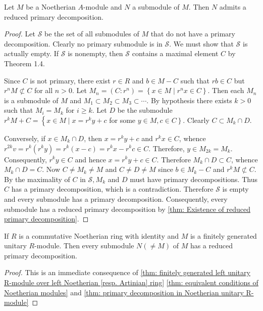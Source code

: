 \begin{theorem}
    \label{thm: primary decomposition in Noetherian unitary R-module}
    Let $M$ be a Noetherian $A$-module and $N$ a submodule of $M$. Then $N$ admits a reduced primary decomposition.
    \begin{proof}
        Let $\mathcal{S}$ be the set of all submodules of $M$ that do not have a primary decomposition.
        Clearly no primary submodule is in $\mathcal{S}$.
        We must show that $\mathcal{S}$ is actually empty. If $\mathcal{S}$ is nonempty, then $\mathcal{S}$ contains a maximal element $C$ by Theorem 1.4.

        Since $C$ is not primary, there exist $r \in R$ and $b \in M-C$ such that $r b \in C$ but $r^n M \not \subset C$ for all $n>0$.
        Let $M_n=\left(C:r^n\right)=\left\{x \in M \mid r^n x \in C\right\}$.
        Then each $M_n$ is a submodule of $M$ and $M_1 \subset M_2 \subset M_3 \subset \cdots$. By hypothesis there exists $k>0$ such that $M_i=M_k$ for $i \geq k$.
        Let $D$ be the submodule $r^kM+C=\left\{x \in M \mid x=r^k y+c\right.$ for some $\left.y \in M, c \in C\right\}$. Clearly $C \subset M_k \cap D$.

        Conversely, if $x \in M_k \cap D$, then $x=r^k y+c$ and $r^k x \in C$, whence $r^{2 k} v=r^k\left(r^k y\right)=r^k(x-c)=r^k x-r^k c \in C$. Therefore, $y\in M_{2 k}=M_k$. Consequently, $r^k y \in C$ and hence $x=r^k y+c \in C$.
        Therefore $M_k \cap D \subset C$, whence $M_k \cap D=C$. Now $C \neq M_k \neq M$ and $C \neq D \neq M$ since $b \in M_k-C$ and $r^k M \not \subset C$. By the maximality of $C$ in $\mathcal{S}, M_k$ and $D$ must have primary decompositions. Thus $C$ has a primary decomposition, which is a contradiction. Therefore $\mathcal{S}$ is empty and every submodule has a primary decomposition. Consequently, every submodule has a reduced primary decomposition by \ref{thm: Existence of reduced primary decomposition}.
    \end{proof}
\end{theorem}

\begin{corollary}
    If $R$ is a commutative Noetherian ring with identity and $M$ is a finitely generated unitary $R$-module.
    Then every submodule $N(\neq M)$ of $M$ has a reduced primary decomposition.
    \begin{proof}
        This is an immediate consequence of \ref{thm: finitely generated left unitary R-module over left Noetherian [resp. Artinian] ring} \ref{thm: equivalent conditions of Noetherian modules} and \ref{thm: primary decomposition in Noetherian unitary R-module}
    \end{proof}
\end{corollary}



